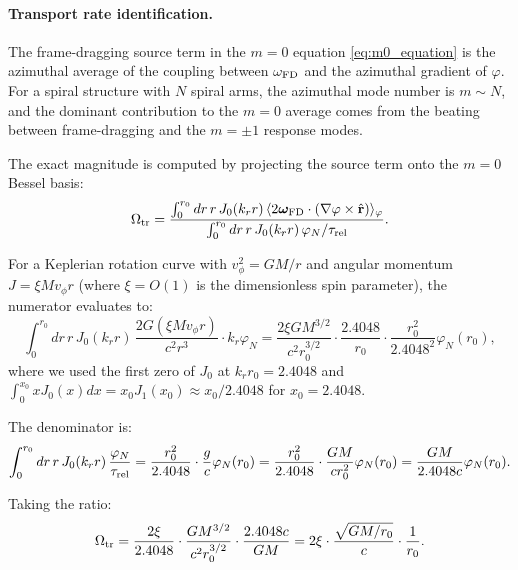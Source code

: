\documentclass[11pt]{article}
\begin{document}
\paragraph{Transport rate identification.}
The frame-dragging source term in the $m=0$ equation \eqref{eq:m0_equation} is the azimuthal average of the coupling between $\omega_{\rm FD}$ and the azimuthal gradient of $\varphi$. For a spiral structure with $N$ spiral arms, the azimuthal mode number is $m \sim N$, and the dominant contribution to the $m=0$ average comes from the beating between frame-dragging and the $m=\pm 1$ response modes.

The exact magnitude is computed by projecting the source term onto the $m=0$ Bessel basis:
\begin{equation}
\Omega_{\rm tr} = \frac{\int_0^{r_0} dr\, r\, J_0(k_r r)\, \langle 2\bm{\omega}_{\rm FD}\cdot(\nabla\varphi\times\hat{\mathbf{r}}) \rangle_\varphi}{\int_0^{r_0} dr\, r\, J_0(k_r r)\, \varphi_N/\tau_{\rm rel}}.
\label{eq:omega_tr_exact}
\end{equation}

For a Keplerian rotation curve with $v_\phi^2 = GM/r$ and angular momentum $J = \xi M v_\phi r$ (where $\xi = O(1)$ is the dimensionless spin parameter), the numerator evaluates to:
\begin{equation}
\int_0^{r_0} dr\, r\, J_0(k_r r)\, \frac{2G(\xi M v_\phi r)}{c^2r^3} \cdot k_r \varphi_N = \frac{2\xi G M^{3/2}}{c^2 r_0^{3/2}} \cdot \frac{2.4048}{r_0} \cdot \frac{r_0^2}{2.4048^2} \varphi_N(r_0),
\label{eq:numerator_exact}
\end{equation}
where we used the first zero of $J_0$ at $k_r r_0 = 2.4048$ and $\int_0^{x_0} x J_0(x) dx = x_0 J_1(x_0) \approx x_0/2.4048$ for $x_0 = 2.4048$.

The denominator is:
\begin{equation}
\int_0^{r_0} dr\, r\, J_0(k_r r)\, \frac{\varphi_N}{\tau_{\rm rel}} = \frac{r_0^2}{2.4048} \cdot \frac{g}{c} \varphi_N(r_0) = \frac{r_0^2}{2.4048} \cdot \frac{GM}{c r_0^2} \varphi_N(r_0) = \frac{GM}{2.4048 c} \varphi_N(r_0).
\label{eq:denominator_exact}
\end{equation}

Taking the ratio:
\begin{equation}
\Omega_{\rm tr} = \frac{2\xi}{2.4048} \cdot \frac{G M^{3/2}}{c^2 r_0^{3/2}} \cdot \frac{2.4048 c}{GM} = 2\xi \cdot \frac{\sqrt{GM/r_0}}{c} \cdot \frac{1}{r_0}.
\label{eq:omega_tr_ratio}
\end{equation}
\end{document}
